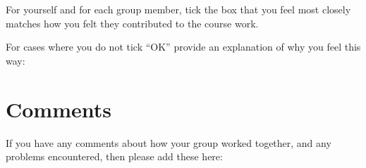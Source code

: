 \documentclass{article}
\begin{document}
For yourself and for each group member, tick the box that you feel
most closely matches how you felt they contributed to the course work.

For cases where you do not tick ``OK'' provide an explanation of why
you feel this way: 

\section{Comments}

If you have any comments about how your group worked together, and any
problems encountered, then please add these here:
\end{document}
